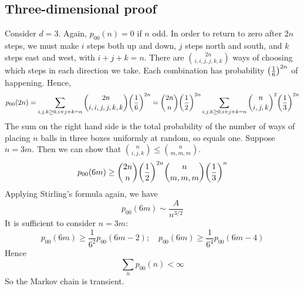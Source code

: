 \subsection{Three-dimensional proof}
Consider \( d = 3 \).
Again, \( p_{00}(n) = 0 \) if \( n \) odd.
In order to return to zero after \( 2n \) steps, we must make \( i \) steps both up and down, \( j \) steps north and south, and \( k \) steps east and west, with \( i+j+k=n \).
There are \( \binom{2n}{i,i,j,j,k,k} \) ways of choosing which steps in each direction we take.
Each combination has probability \( \qty(\frac{1}{6})^{2n} \) of happening.
Hence,
\[
	p_{00}(2n) = \sum_{i,j,k \geq 0, i+j+k=n} \binom{2n}{i,i,j,j,k,k} \qty(\frac{1}{6})^{2n} = \binom{2n}{n} \qty(\frac{1}{2})^{2n} \sum_{i,j,k \geq 0, i+j+k=n} \binom{n}{i,j,k}^2 \qty(\frac{1}{3})^{2n}
\]
The sum on the right hand side is the total probability of the number of ways of placing \( n \) balls in three boxes uniformly at random, so equals one.
Suppose \( n = 3m \).
Then we can show that \( \binom{n}{i,j,k} \leq \binom{n}{m,m,m} \).
\[
	p_{00}(6m) \geq \binom{2n}{n} \qty(\frac{1}{2})^{2n} \binom{n}{m,m,m} \qty(\frac{1}{3})^{n}
\]
Applying Stirling's formula again, we have
\[
	p_{00}(6m) \sim \frac{A}{n^{3/2}}
\]
It is sufficient to consider \( n = 3m \):
\[
	p_{00}(6m) \geq \frac{1}{6^2} p_{00}(6m-2);\quad p_{00}(6m) \geq \frac{1}{6^4} p_{00}(6m-4)
\]
Hence
\[
	\sum_n p_{00}(n) < \infty
\]
So the Markov chain is transient.